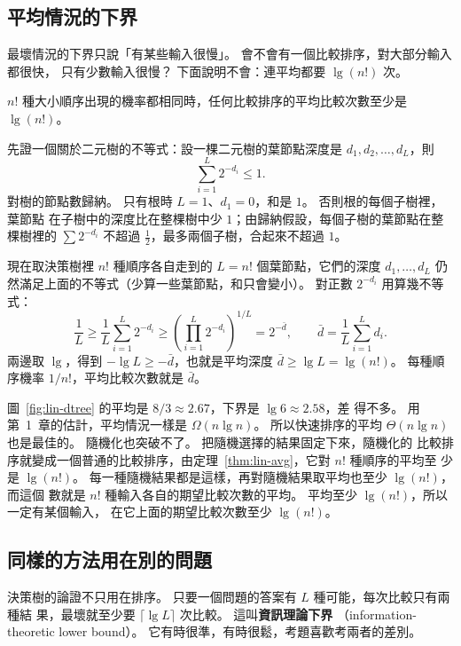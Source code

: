 \subsection{平均情況的下界}

最壞情況的下界只說「有某些輸入很慢」。 會不會有一個比較排序，對大部分輸入都很快，
只有少數輸入很慢？ 下面說明不會：連平均都要 $\lg(n!)$ 次。

\begin{theorem}
\label{thm:lin-avg}
$n!$ 種大小順序出現的機率都相同時，任何比較排序的平均比較次數至少是 $\lg(n!)$。
\end{theorem}

\begin{whybox}[平均深度至少 $\lg L$]
先證一個關於二元樹的不等式：設一棵二元樹的葉節點深度是 $d_1, d_2, \ldots, d_L$，則
\[
\sum_{i=1}^{L} 2^{-d_i} \le 1.
\]
對樹的節點數歸納。 只有根時 $L = 1$、$d_1 = 0$，和是 $1$。 否則根的每個子樹裡，葉節點
在子樹中的深度比在整棵樹中少 $1$；由歸納假設，每個子樹的葉節點在整棵樹裡的
$\sum 2^{-d_i}$ 不超過 $\frac{1}{2}$，最多兩個子樹，合起來不超過 $1$。

現在取決策樹裡 $n!$ 種順序各自走到的 $L = n!$ 個葉節點，它們的深度 $d_1, \ldots, d_L$
仍然滿足上面的不等式（少算一些葉節點，和只會變小）。 對正數 $2^{-d_i}$ 用算幾不等式：
\[
\frac{1}{L} \ge \frac{1}{L}\sum_{i=1}^{L} 2^{-d_i}
\ge \left( \prod_{i=1}^{L} 2^{-d_i} \right)^{1/L}
= 2^{-\bar{d}}, \qquad \bar{d} = \frac{1}{L}\sum_{i=1}^{L} d_i.
\]
兩邊取 $\lg$，得到 $-\lg L \ge -\bar{d}$，也就是平均深度 $\bar{d} \ge \lg L = \lg(n!)$。
每種順序機率 $1/n!$，平均比較次數就是 $\bar{d}$。
\end{whybox}

圖~\ref{fig:lin-dtree} 的平均是 $8/3 \approx 2.67$，下界是 $\lg 6 \approx 2.58$，差
得不多。 用第~1~章的估計，平均情況一樣是 $\Omega(n \lg n)$。 所以快速排序的平均
$\Theta(n \lg n)$ 也是最佳的。 隨機化也突破不了。 把隨機選擇的結果固定下來，隨機化的
比較排序就變成一個普通的比較排序，由定理~\ref{thm:lin-avg}，它對 $n!$ 種順序的平均至
少是 $\lg(n!)$。 每一種隨機結果都是這樣，再對隨機結果取平均也至少 $\lg(n!)$，而這個
數就是 $n!$ 種輸入各自的期望比較次數的平均。 平均至少 $\lg(n!)$，所以一定有某個輸入，
在它上面的期望比較次數至少 $\lg(n!)$。

\subsection{同樣的方法用在別的問題}

決策樹的論證不只用在排序。 只要一個問題的答案有 $L$ 種可能，每次比較只有兩種結
果，最壞就至少要 $\lceil \lg L \rceil$ 次比較。 這叫\textbf{資訊理論下界}
（information-theoretic lower bound）。 它有時很準，有時很鬆，考題喜歡考兩者的差別。

